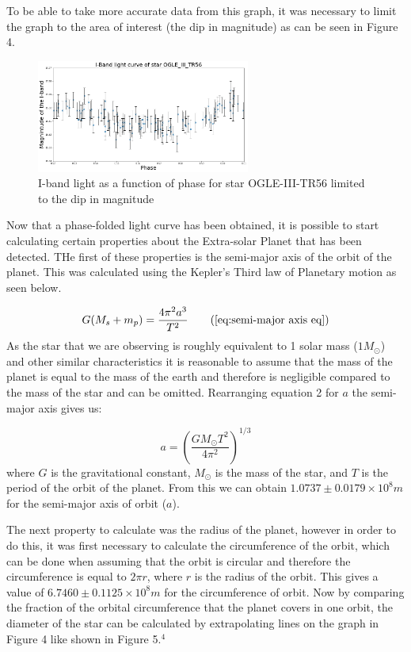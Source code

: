 \documentclass[]{article}
\begin{document}
To be able to take more accurate data from this graph, it
was necessary to limit the graph to the area of interest 
(the dip in magnitude) as can be seen in Figure 4.

\begin{figure}[h]
  \includegraphics[width=7cm]{images/I-band_limit.png}
  \caption{I-band light as a function of phase for star OGLE-III-TR56
  limited to the dip in magnitude}
  \label{fig:HD-_init}
  \end{figure}

Now that a phase-folded light curve has been obtained,
it is possible to start calculating certain properties
about the Extra-solar Planet that has been detected.
THe first of these properties is the semi-major axis
of the orbit of the planet. This was calculated using the 
Kepler's Third law of Planetary motion as seen below.

\begin{equation}
  G(M_s+m_p) = \frac{4\pi^2a^3}{T^2} \tag{\ref{eq:semi-major axis eq}}
  \end{equation}
As the star that we are observing is roughly equivalent to 1 
solar mass ($1M_\odot $) and other similar characteristics it is reasonable 
to assume that the mass of the planet is equal to 
the mass of the earth and therefore is negligible compared to 
the mass of the star and can be omitted. 
Rearranging equation 2 for $a$ the semi-major axis
gives us:

\begin{equation}
  a = \left(\frac{GM_{\odot}T^2}{4\pi^2}\right)^{1/3}
  \end{equation}
where $G$ is the gravitational constant, $M_\odot$ is the mass of the star,
and $T$ is the period of the orbit of the planet.
From this we can obtain \newline$1.0737\pm0.0179\times10^{8}m $
for the semi-major axis of orbit ($a$).
\par
The next property to calculate was the radius of the planet,
however in order to do this, it was first necessary to calculate 
the circumference of the orbit, which can be done when assuming 
that the orbit is circular and therefore the circumference is 
equal to $2\pi r $, where $r$ is the radius of the orbit.
This gives a value of $6.7460\pm0.1125 \times10^{8}m $
for the circumference of orbit. Now by comparing the fraction 
of the orbital circumference that the planet covers in one orbit, 
the diameter of the star can be calculated by extrapolating 
lines on the graph in Figure 4 like shown in Figure 5.$^4$ 
\end{document}
